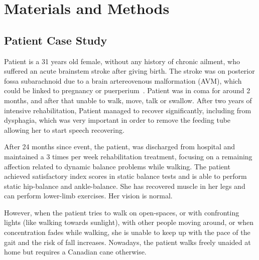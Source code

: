 \documentclass[conference]{IEEEtran}
\begin{document}
\section{Materials and Methods}

\subsection{Patient Case Study}
\label{sec:case-study}

Patient is a 31 years old female, without any history of chronic ailment, who suffered an acute brainstem stroke after giving birth.  The stroke was on posterior fossa subarachnoid due to a brain artereovenous malformation (AVM), which could be linked to pregnancy or puerperium~\cite{Porras.etal2017}.  Patient was in coma for around 2 months, and after that unable to walk, move, talk or swallow.  After two years of intensive rehabilitation, Patient managed to recover significantly, including from dysphagia, which was very important in order to remove the feeding tube allowing her to start speech recovering.  

After 24 months since event, the patient, was discharged from hospital and maintained a 3 times per week rehabilitation treatment, focusing on a remaining affection related to dynamic balance problems while walking.  The patient achieved satisfactory index scores in static balance tests and is able to perform static hip-balance and ankle-balance.  She has recovered muscle in her legs and can perform lower-limb exercises.  Her vision is normal.   

However, when the patient tries to walk on open-spaces, or with confronting lights (like walking towards sunlight), with other people moving around, or when concentration fades while walking, she is unable to keep up with the pace of the gait and the risk of fall increases.  Nowadays, the patient walks freely unaided at home but requires a Canadian cane otherwise.
\end{document}
